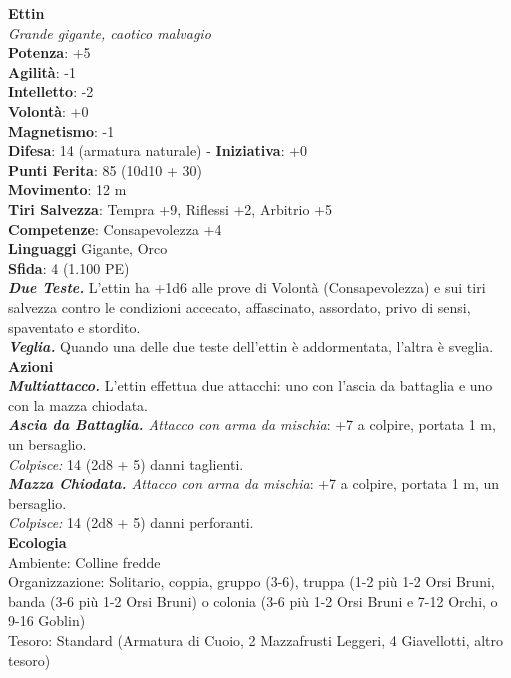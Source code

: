\begin{multicols}{2}
\medskip\textbf{Ettin}\\
\emph{Grande gigante, caotico malvagio}\\
\textbf{Potenza}: +5\\
\textbf{Agilità}: -1\\
\textbf{Intelletto}: -2\\
\textbf{Volontà}: +0\\
\textbf{Magnetismo}: -1\\
\textbf{Difesa}: 14 (armatura naturale) - \textbf{Iniziativa}: +0\\
\textbf{Punti Ferita}: 85 (10d10 + 30)\\
\textbf{Movimento}: 12 m\\
\textbf{Tiri Salvezza}: Tempra +9, Riflessi +2, Arbitrio +5\\
\textbf{Competenze}: Consapevolezza +4\\
\textbf{Linguaggi} Gigante, Orco\\
\textbf{Sfida}: 4 (1.100 PE)\smallskip\\
\emph{\textbf{Due Teste.}} L'ettin ha +1d6 alle prove di Volontà (Consapevolezza) e sui tiri salvezza contro le condizioni accecato, affascinato, assordato, privo di sensi, spaventato e stordito. \\
\emph{\textbf{Veglia.}} Quando una delle due teste dell'ettin è addormentata, l'altra è sveglia.\\
\smallskip\textbf{Azioni} \\
\emph{\textbf{Multiattacco.}} L'ettin effettua due attacchi: uno con l'ascia da battaglia e uno con la mazza chiodata.\\
\emph{\textbf{Ascia da Battaglia.} Attacco con arma da mischia}: +7 a colpire, portata 1 m, un bersaglio.\\
\emph{Colpisce:} 14 (2d8 + 5) danni taglienti.\\
\emph{\textbf{Mazza Chiodata.} Attacco con arma da mischia}: +7 a colpire, portata 1 m, un bersaglio.\\
\emph{Colpisce:} 14 (2d8 + 5) danni perforanti.\\
\textbf{Ecologia}\\
Ambiente: Colline fredde\\
Organizzazione: Solitario, coppia, gruppo (3-6), truppa (1-2 più 1-2 Orsi Bruni, banda (3-6 più 1-2 Orsi Bruni) o colonia (3-6 più 1-2 Orsi Bruni e 7-12 Orchi, o 9-16 Goblin)\\
Tesoro: Standard (Armatura di Cuoio, 2 Mazzafrusti Leggeri, 4 Giavellotti, altro tesoro)\\

\end{multicols}
